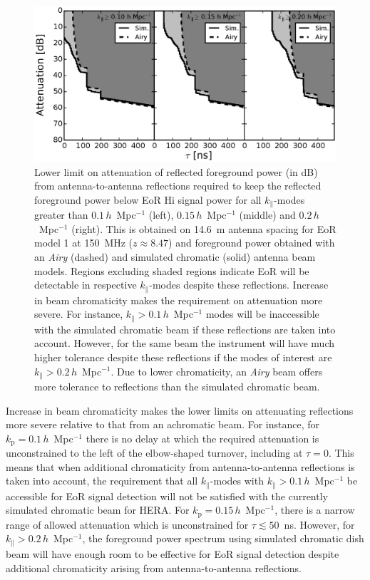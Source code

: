 \documentclass[preprint2,iop,numberedappendix,twocolappendix,appendixfloats]{emulateapj}
\begin{document}
\begin{figure}[htb]
\centering
\includegraphics[width=\linewidth]{spec_on_foreground_reflected_power_21cmfast_14.6m_150.0_MHz_subband_v2.eps}
\caption{Lower limit on attenuation of reflected foreground power (in dB) from antenna-to-antenna reflections required to keep the reflected foreground power below EoR H{\sc i} signal power for all $k_\parallel$-modes greater than $0.1\,h$~Mpc$^{-1}$ (left), $0.15\,h$~Mpc$^{-1}$ (middle) and $0.2\,h$~Mpc$^{-1}$ (right). This is obtained on 14.6~m antenna spacing for EoR model 1 at 150~MHz ($z\approx 8.47$) and foreground power obtained with an {\it Airy} (dashed) and simulated chromatic (solid) antenna beam models. Regions excluding shaded regions indicate EoR will be detectable in respective $k_\parallel$-modes despite these reflections. Increase in beam chromaticity makes the requirement on attenuation more severe. For instance, $k_\parallel > 0.1\,h$~Mpc$^{-1}$ modes will be inaccessible with the simulated chromatic beam if these reflections are taken into account. However, for the same beam the instrument will have much higher tolerance despite these reflections if the modes of interest are $k_\parallel > 0.2\,h$~Mpc$^{-1}$. Due to lower chromaticity, an {\it Airy} beam offers more tolerance to reflections than the simulated chromatic beam.}
\label{fig:fg-reflections}
\end{figure}

Increase in beam chromaticity makes the lower limits on attenuating reflections more severe relative to that from an achromatic beam. For instance, for $k_\textrm{p}=0.1\,h$~Mpc$^{-1}$ there is no delay at which the required attenuation is unconstrained to the left of the elbow-shaped turnover, including at $\tau=0$. This means that when additional chromaticity from antenna-to-antenna reflections is taken into account, the requirement that all $k_\parallel$-modes with $k_\parallel > 0.1\,h$~Mpc$^{-1}$ be accessible for EoR signal detection will not be satisfied with the currently simulated chromatic beam for HERA. For $k_\textrm{p}=0.15\,h$~Mpc$^{-1}$, there is a narrow range of allowed attenuation which is unconstrained for $\tau \lesssim 50$~ns. However, for $k_\parallel > 0.2\,h$~Mpc$^{-1}$, the foreground power spectrum using simulated chromatic dish beam will have enough room to be effective for EoR signal detection despite additional chromaticity arising from antenna-to-antenna reflections. 
\end{document}
